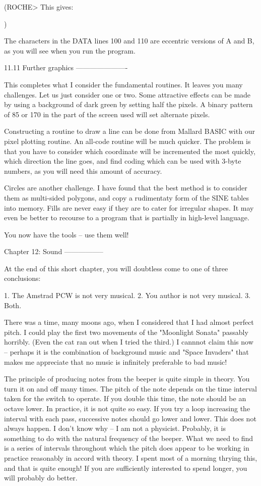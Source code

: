 (ROCHE> This gives:

$$$$
)

The  characters in the DATA lines 100 and 110 are eccentric versions of A  and 
B, as you will see when you run the program.


11.11 Further graphics
----------------------

This  completes what I consider the fundamental routines. It leaves  you  many 
challenges.  Let us just consider one or two. Some attractive effects  can  be 
made by using a background of dark green by setting half the pixels. A  binary 
pattern of 85 or 170 in the part of the screen used will set alternate pixels.

Constructing a routine to draw a line can be done from Mallard BASIC with  our 
pixel plotting routine. An all-code routine will be much quicker. The  problem 
is  that  you have to consider which coordinate will be incremented  the  most 
quickly, which direction the line goes, and find coding which can be used with 
3-byte numbers, as you will need this amount of accuracy.

Circles  are  another  challenge.  I have found that the  best  method  is  to 
consider them as multi-sided polygons, and copy a rudimentaty form of the SINE 
tables  into memory. Fills are never easy if they are to cater  for  irregular 
shapes.  It may even be better to recourse to a program that is  partially  in 
high-level language.

You now have the tools -- use them well!


Chapter 12: Sound
-----------------

At  the  end of this short chapter, you will doubtless come to  one  of  three 
conclusions:

     1. The Amstrad PCW is not very musical.
     2. You author is not very musical.
     3. Both.

There was a time, many moons ago, when I considered that I had almost  perfect 
pitch. I could play the first two movements of the "Moonlight Sonata" passably 
horribly. (Even the cat ran out when I tried the third.) I cannnot claim  this 
now -- perhaps it is the combination of background music and "Space  Invaders" 
that makes me appreciate that no music is infinitely preferable to bad music!

The  principle of producing notes from the beeper is quite simple  in  theory. 
You  turn it on and off many times. The pitch of the note depends on the  time 
interval  taken for the switch to operate. If you double this time,  the  note 
should be an octave lower. In practice, it is not quite so easy. If you try  a 
loop increasing the interval with each pass, successive notes should go  lower 
and  lower.  This  does  not always happen. I don't know why --  I  am  not  a 
physicist.  Probably, it is something to do with the natural frequency of  the 
beeper.  What  we need to find is a series of intervals throughout  which  the 
pitch does appear to be working in practice reasonably in accord with  theory. 
I  spent most of a morning thrying this, and that is quite enough! If you  are 
sufficiently interested to spend longer, you will probably do better.


